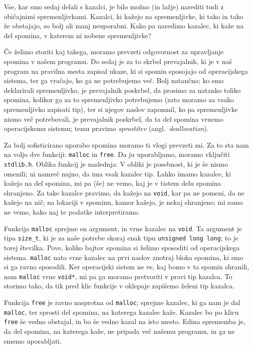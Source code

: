 \documentclass{book}
\begin{document}
Vse, kar smo sedaj delali s kazalci, je bilo možno (in lažje) narediti tudi z
običajnimi spremenljivkami. Kazalci, ki kažejo na spremenljivke, ki tako in tako
že obstajajo, so bolj ali manj neuporabni. Kako pa naredimo kazalec, ki kaže
na del spomina, v katerem ni nobene spremenljivke?

Če želimo storiti kaj takega, moramo prevzeti odgovornost za upravljanje spomina
v našem programu. Do sedaj je za to skrbel prevajalnik, ki je v naš program na
pravilna mesta zapisal ukaze, ki si spomin sposojajo od operacijskega sistema,
ter ga vračajo, ko ga ne potrebujemo več. Bolj natančno; ko smo deklarirali
spremenljivko, je prevajalnik poskrbel, da prosimo za natanko toliko spomina,
kolikor ga za to spremenljivko potrebujemo (zato moramo za vsako spremenljivko
zapisati tip), ter si njegov naslov zapomnil,
ko pa spremenljivke nismo več potrebovali, je prevajalnik poskrbel, da ta del
spomina vrnemo operacijskemu sistemu; temu pravimo \emph{sprostitev}
(angl.~\textit{deallocation}).

Za bolj sofisticirano uporabo spomina moramo ti vlogi prevzeti mi. Za to sta
nam na voljo dve funkciji: \verb+malloc+ in \verb+free+. Da ju uporabljamo,
moramo vključiti \verb+stdlib.h+.
Oblika funkcij je naslednja:
V obliki je posebnost, ki je še nismo omenili; ni namreč nujno, da ima vsak
kazalec tip. Lahko imamo kazalce, ki kažejo na del spomina, mi pa (še) ne vemo,
kaj je v tistem delu spomina shranjeno. Za take kazalce pravimo, da kažejo
na \verb+void+, kar pa ne pomeni, da ne kažejo na nič; na lokaciji v spominu,
kamor kažejo, je nekaj shranjeno; mi samo ne vemo, kako naj te podatke
interpretiramo.

Funkcija \verb+malloc+ sprejme en argument, in vrne kazalec na \verb+void+.
Ta argument je tipa \verb+size_t+, ki je za naše potrebe skoraj enak tipu
\verb+unsigned long long+; to je torej številka. Pove, koliko bajtov spomina si
želimo sposoditi od operacijskega sistema. \verb+malloc+ nato vrne kazalec na
prvi naslov znotraj bloka spomina, ki smo si ga ravno sposodili. Ker operacijski
sistem ne ve, kaj bomo v ta spomin shranili, nam \verb+malloc+ vrne \verb+void*+,
mi pa ga moramo pretvoriti v pravi tip kazalca. To storimo tako, da tik pred
klic funkcije v oklepaje zapišemo želeni tip kazalca.

Funkcija \verb+free+ je ravno nasprotna od \verb+malloc+; sprejme kazalec, ki ga
nam je dal \verb+malloc+, ter sprosti del spomina, na katerega kazalec kaže.
Kazalec bo po klicu \verb+free+ še vedno obstajal, in bo še vedno kazal na isto
mesto. Edina sprememba je, da del spomina, na katerega kaže, ne pripada več
našemu programu, in ga ne smemo uporabljati.
\end{document}
